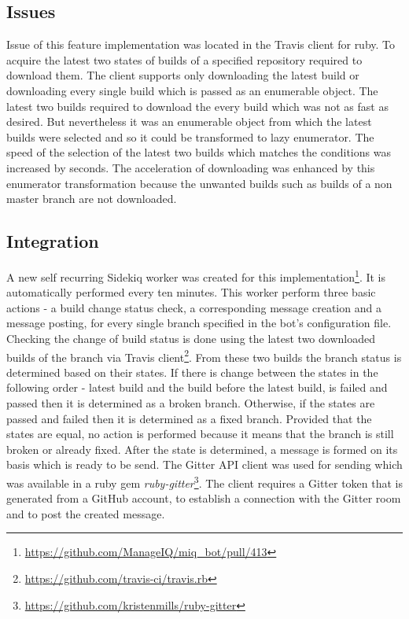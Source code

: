 \subsection{Issues}

Issue of this feature implementation was located in the Travis client for ruby. To acquire the latest two states of builds of a specified repository required to download them. The client supports only downloading the latest build or downloading every single build which is passed as an enumerable object. The latest two builds required to download the every build which was not as fast as desired. But nevertheless it was an enumerable object from which the latest builds were selected and so it could be transformed to lazy enumerator. The speed of the selection of the latest two builds which matches the conditions was increased by seconds. The acceleration of downloading was enhanced by this enumerator transformation because the unwanted builds such as builds of a non master branch are not downloaded.

\subsection{Integration}

A new self recurring Sidekiq worker was created for this implementation\footnote{\url{https://github.com/ManageIQ/miq_bot/pull/413}}. It is automatically performed every ten minutes. This worker perform three basic actions - a build change status check, a corresponding message creation and a message posting, for every single branch specified in the bot's configuration file. Checking the change of build status is done using the latest two downloaded builds of the branch via Travis client\footnote{\url{https://github.com/travis-ci/travis.rb}}. From these two builds the branch status is determined based on their states. If there is change between the states in the following order - latest build and the build before the latest build, is failed and passed then it is determined as a broken branch. Otherwise, if the states are passed and failed then it is determined as a fixed branch. Provided that the states are equal, no action is performed because it means that the branch is still broken or already fixed. After the state is determined, a message is formed on its basis which is ready to be send. The Gitter API client was used for sending which was available in a ruby gem \textit{ruby-gitter}\footnote{\url{https://github.com/kristenmills/ruby-gitter}}. The client requires a Gitter token that is generated from a GitHub account, to establish a connection with the Gitter room and to post the created message.

